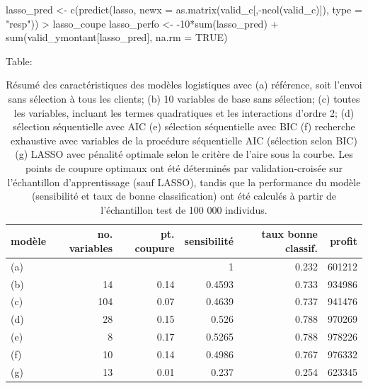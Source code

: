 \documentclass[
  11pt,
  letterpaper,
]{scrbook}
\newenvironment{Shaded}{\begin{snugshade}}{\end{snugshade}}
\newcommand{\AttributeTok}[1]{\textcolor[rgb]{0.40,0.45,0.13}{#1}}
\newcommand{\ConstantTok}[1]{\textcolor[rgb]{0.56,0.35,0.01}{#1}}
\newcommand{\DecValTok}[1]{\textcolor[rgb]{0.68,0.00,0.00}{#1}}
\newcommand{\FunctionTok}[1]{\textcolor[rgb]{0.28,0.35,0.67}{#1}}
\newcommand{\NormalTok}[1]{\textcolor[rgb]{0.00,0.23,0.31}{#1}}
\newcommand{\OtherTok}[1]{\textcolor[rgb]{0.00,0.23,0.31}{#1}}
\newcommand{\SpecialCharTok}[1]{\textcolor[rgb]{0.37,0.37,0.37}{#1}}
\newcommand{\StringTok}[1]{\textcolor[rgb]{0.13,0.47,0.30}{#1}}
\theoremstyle{definition}
\theoremstyle{remark}
\begin{document}
\begin{Shaded}
\begin{Highlighting}[]
\NormalTok{lasso\_pred }\OtherTok{\textless{}{-}} \FunctionTok{c}\NormalTok{(}\FunctionTok{predict}\NormalTok{(lasso, }
        \AttributeTok{newx =} \FunctionTok{as.matrix}\NormalTok{(valid\_c[,}\SpecialCharTok{{-}}\FunctionTok{ncol}\NormalTok{(valid\_c)]), }
        \AttributeTok{type =} \StringTok{"resp"}\NormalTok{)) }\SpecialCharTok{\textgreater{}}\NormalTok{ lasso\_coupe}
\NormalTok{lasso\_perfo }\OtherTok{\textless{}{-}} \SpecialCharTok{{-}}\DecValTok{10}\SpecialCharTok{*}\FunctionTok{sum}\NormalTok{(lasso\_pred) }\SpecialCharTok{+} 
  \FunctionTok{sum}\NormalTok{(valid\_ymontant[lasso\_pred], }\AttributeTok{na.rm =} \ConstantTok{TRUE}\NormalTok{)}
\end{Highlighting}
\end{Shaded}

Table:

\hypertarget{tbl-03-summarylog}{}
\begin{table}
\caption{\label{tbl-03-summarylog}Résumé des caractéristiques des modèles logistiques avec (a) référence,
soit l'envoi sans sélection à tous les clients; (b) 10 variables de base
sans sélection; (c) toutes les variables, incluant les termes
quadratiques et les interactions d'ordre 2; (d) sélection séquentielle
avec AIC (e) sélection séquentielle avec BIC (f) recherche exhaustive
avec variables de la procédure séquentielle AIC (sélection selon BIC)
(g) LASSO avec pénalité optimale selon le critère de l'aire sous la
courbe. Les points de coupure optimaux ont été déterminés par
validation-croisée sur l'échantillon d'apprentissage (sauf LASSO),
tandis que la performance du modèle (sensibilité et taux de bonne
classification) ont été calculés à partir de l'échantillon test de 100
000 individus. }\tabularnewline

\centering
\begin{tabular}{lrrrrr}
\toprule
modèle & no. variables & pt. coupure &  sensibilité & taux bonne classif. & profit\\
\midrule
(a) &  &  & 1 & 0.232 & 601212\\
(b) & 14 & 0.14 & 0.4593 & 0.733 & 934986\\
(c) & 104 & 0.07 & 0.4639 & 0.737 & 941476\\
(d) & 28 & 0.15 & 0.526 & 0.788 & 970269\\
(e) & 8 & 0.17 & 0.5265 & 0.788 & 978226\\
\addlinespace
(f) & 10 & 0.14 & 0.4986 & 0.767 & 976332\\
(g) & 13 & 0.01 & 0.237 & 0.254 & 623345\\
\bottomrule
\end{tabular}
\end{table}
\end{document}
